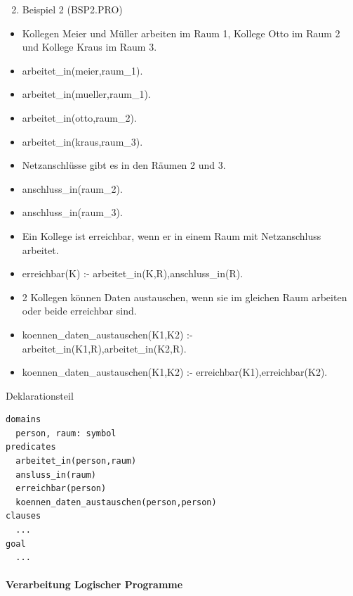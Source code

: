 \documentclass[a4paper]{article}
\begin{document}
\begin{multicols}{3}
  \begin{enumerate}
    \setcounter{enumi}{1}
    \itemsep1pt\parskip0pt
    \item
          Beispiel 2 (BSP2.PRO)
  \end{enumerate}

  \begin{itemize}
    \itemsep1pt\parskip0pt
    \item
          Kollegen Meier und Müller arbeiten im Raum 1, Kollege Otto im Raum 2
          und Kollege Kraus im Raum 3.
    \item
          arbeitet\_in(meier,raum\_1).
    \item
          arbeitet\_in(mueller,raum\_1).
    \item
          arbeitet\_in(otto,raum\_2).
    \item
          arbeitet\_in(kraus,raum\_3).
    \item
          Netzanschlüsse gibt es in den Räumen 2 und 3.
    \item
          anschluss\_in(raum\_2).
    \item
          anschluss\_in(raum\_3).
    \item
          Ein Kollege ist erreichbar, wenn er in einem Raum mit Netzanschluss
          arbeitet.
    \item
          erreichbar(K) :- arbeitet\_in(K,R),anschluss\_in(R).
    \item
          2 Kollegen können Daten austauschen, wenn sie im gleichen Raum
          arbeiten oder beide erreichbar sind.
    \item
          koennen\_daten\_austauschen(K1,K2) :-
          arbeitet\_in(K1,R),arbeitet\_in(K2,R).
    \item
          koennen\_daten\_austauschen(K1,K2) :- erreichbar(K1),erreichbar(K2).
  \end{itemize}

  Deklarationsteil

  \begin{verbatim}
domains
  person, raum: symbol
predicates
  arbeitet_in(person,raum)
  ansluss_in(raum)
  erreichbar(person)
  koennen_daten_austauschen(person,person)
clauses
  ...
goal
  ...
\end{verbatim}

  \paragraph{Verarbeitung Logischer
    Programme}\label{verarbeitung-logischer-programme}


\end{multicols}
\end{document}
